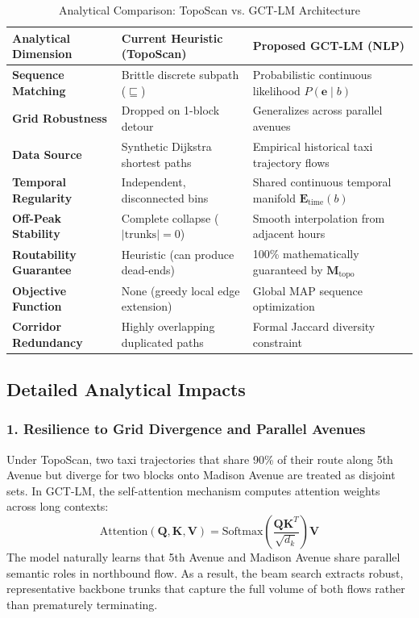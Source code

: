 \documentclass[12pt,a4paper]{article}
\begin{document}
\begin{table}[htbp]
\centering
\small
\caption{Analytical Comparison: TopoScan vs. GCT-LM Architecture}
\label{tab:analytical_comparison}
\begin{tabularx}{\textwidth}{@{}p{3.5cm}p{5.0cm}X@{}}
\toprule
\textbf{Analytical Dimension} & \textbf{Current Heuristic (TopoScan)} & \textbf{Proposed GCT-LM (NLP)} \\ \midrule
\textbf{Sequence Matching} & Brittle discrete subpath ($\sqsubseteq$) & Probabilistic continuous likelihood $P(\mathbf{e} \mid b)$ \\ \addlinespace
\textbf{Grid Robustness} & Dropped on 1-block detour & Generalizes across parallel avenues \\ \addlinespace
\textbf{Data Source} & Synthetic Dijkstra shortest paths & Empirical historical taxi trajectory flows \\ \addlinespace
\textbf{Temporal Regularity} & Independent, disconnected bins & Shared continuous temporal manifold $\mathbf{E}_{\text{time}}(b)$ \\ \addlinespace
\textbf{Off-Peak Stability} & Complete collapse ($|\text{trunks}| = 0$) & Smooth interpolation from adjacent hours \\ \addlinespace
\textbf{Routability Guarantee} & Heuristic (can produce dead-ends) & 100\% mathematically guaranteed by $\mathbf{M}_{\text{topo}}$ \\ \addlinespace
\textbf{Objective Function} & None (greedy local edge extension) & Global MAP sequence optimization \\ \addlinespace
\textbf{Corridor Redundancy} & Highly overlapping duplicated paths & Formal Jaccard diversity constraint \\ \bottomrule
\end{tabularx}
\end{table}

\subsection{Detailed Analytical Impacts}

\subsubsection{1. Resilience to Grid Divergence and Parallel Avenues}
Under TopoScan, two taxi trajectories that share 90\% of their route along 5th Avenue but diverge for two blocks onto Madison Avenue are treated as disjoint sets. In GCT-LM, the self-attention mechanism computes attention weights across long contexts:
\begin{equation}
\text{Attention}(\mathbf{Q}, \mathbf{K}, \mathbf{V}) = \text{Softmax}\left(\frac{\mathbf{Q}\mathbf{K}^T}{\sqrt{d_k}}\right)\mathbf{V}
\end{equation}
The model naturally learns that 5th Avenue and Madison Avenue share parallel semantic roles in northbound flow. As a result, the beam search extracts robust, representative backbone trunks that capture the full volume of both flows rather than prematurely terminating.
\end{document}

